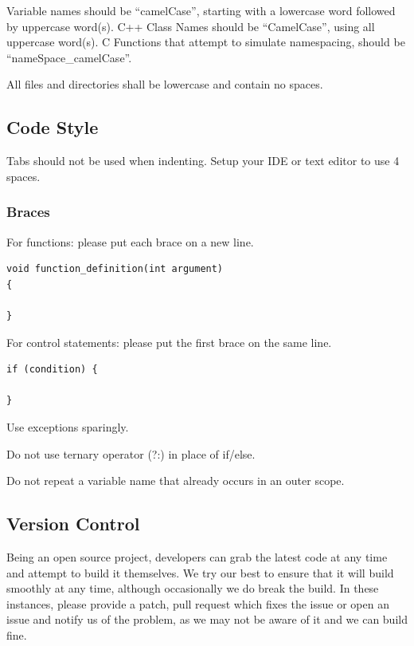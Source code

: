 \documentclass[a4paper, 11pt]{report}
\begin{document}
Variable names should be ``camelCase'', starting with a lowercase word
followed by uppercase word(s). C++ Class Names should be ``CamelCase'',
using all uppercase word(s). C Functions that attempt to simulate
namespacing, should be ``nameSpace\_camelCase''.

All files and directories shall be lowercase and contain no spaces.

\hypertarget{code-style}{%
\subsection{Code Style}\label{code-style}}

Tabs should not be used when indenting. Setup your IDE or text editor to
use 4 spaces.

\hypertarget{braces}{%
\subsubsection{Braces}\label{braces}}

For functions: please put each brace on a new line.

\begin{verbatim}
void function_definition(int argument)
{

}
\end{verbatim}

For control statements: please put the first brace on the same line.

\begin{verbatim}
if (condition) {

}
\end{verbatim}

Use exceptions sparingly.

Do not use ternary operator (?:) in place of if/else.

Do not repeat a variable name that already occurs in an outer scope.

\hypertarget{version-control}{%
\subsection{Version Control}\label{version-control}}

Being an open source project, developers can grab the latest code at any
time and attempt to build it themselves. We try our best to ensure that
it will build smoothly at any time, although occasionally we do break
the build. In these instances, please provide a patch, pull request
which fixes the issue or open an issue and notify us of the problem, as
we may not be aware of it and we can build fine.
\end{document}
